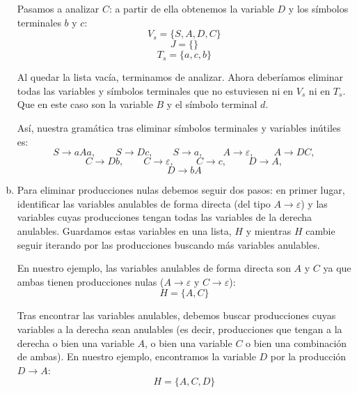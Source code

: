 \documentclass[10pt,a4paper,spanish]{report}
\begin{document}
\begin{enumerate}[a)]
  Pasamos a analizar $C$: a partir de ella obtenemos la variable $D$ y los símbolos terminales $b$ y $c$:
  \begin{displaymath}
    V_s = \{S,A,D,C\}
  \end{displaymath}
  \begin{displaymath}
    J = \{\}
  \end{displaymath}
  \begin{displaymath}
    T_s = \{a,c,b\}
  \end{displaymath}

  Al quedar la lista vacía, terminamos de analizar. Ahora deberíamos eliminar todas las variables y símbolos terminales que no estuviesen ni en $V_s$ ni en $T_s$. Que en este caso son la variable $B$ y el símbolo terminal $d$. 

  Así, nuestra gramática tras eliminar símbolos terminales y variables inútiles es:
  \begin{displaymath}
    S \rightarrow aAa, \qquad S \rightarrow Dc, \qquad S \rightarrow a, \qquad A \rightarrow \varepsilon, \qquad A \rightarrow DC,
\end{displaymath}
\begin{displaymath}
    C \rightarrow Db, \qquad C \rightarrow \varepsilon, \qquad\ C \rightarrow c, \qquad\ D \rightarrow A, 
\end{displaymath}
\begin{displaymath}
    D \rightarrow bA
\end{displaymath}

\item Para eliminar producciones nulas debemos seguir dos pasos: en primer lugar, identificar las variables anulables de forma directa (del tipo $A \rightarrow \varepsilon$) y las variables cuyas producciones tengan todas las variables de la derecha anulables. Guardamos estas  variables en una lista, $H$ y mientras $H$ cambie seguir iterando por las producciones buscando más variables anulables.

En nuestro ejemplo, las variables anulables de forma directa son $A$ y $C$ ya que ambas tienen producciones nulas ($A \rightarrow \varepsilon$ y $C \rightarrow \varepsilon$):
\begin{displaymath}
H = \{A,C\}
\end{displaymath}

Tras encontrar las variables anulables, debemos buscar producciones cuyas variables a la derecha sean anulables (es decir, producciones que tengan a la derecha o bien una variable $A$, o bien una variable $C$ o bien una combinación de ambas). En nuestro ejemplo, encontramos la variable $D$ por la producción $D \rightarrow A$:
\begin{displaymath}
H = \{A,C,D\}
\end{displaymath}


\end{enumerate}
\end{document}

